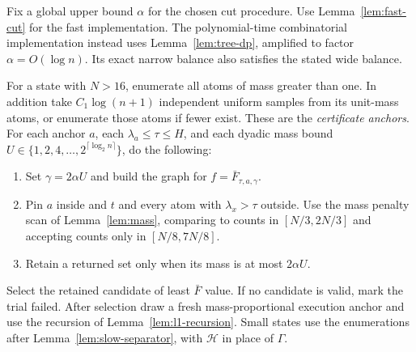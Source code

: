 \documentclass[11pt]{article}
\theoremstyle{definition}
\begin{document}
Fix a global upper bound $\alpha$ for the chosen cut procedure.
Use Lemma~\ref{lem:fast-cut} for the fast implementation.
The polynomial-time combinatorial implementation instead uses
Lemma~\ref{lem:tree-dp}, amplified to factor $\alpha=O(\log n)$.
Its exact narrow balance also satisfies the stated wide balance.

For a state with $N>16$, enumerate all atoms of mass greater than one.
In addition take $C_1\log(n+1)$ independent uniform samples from its
unit-mass atoms, or enumerate those atoms if fewer exist. These are the
\emph{certificate anchors}. For each anchor $a$, each
$\lambda_a\le\tau\le H$, and each dyadic mass bound
$U\in\{1,2,4,\ldots,2^{\lceil\log_2n\rceil}\}$, do the following:
\begin{enumerate}[label=(\arabic*)]
\item Set $\gamma=2\alpha U$ and build the graph for
$f=\bar F_{\tau,a,\gamma}$.
\item Pin $a$ inside and $t$ and every atom with $\lambda_x>\tau$ outside.
Use the mass penalty scan of Lemma~\ref{lem:mass}, comparing to counts
in $[N/3,2N/3]$ and accepting counts only in $[N/8,7N/8]$.
\item Retain a returned set only when its mass is at most $2\alpha U$.
\end{enumerate}
Select the retained candidate of least $\bar F$ value.
If no candidate is valid, mark the trial failed.
After selection draw a fresh mass-proportional execution anchor and
use the recursion of Lemma~\ref{lem:l1-recursion}.
Small states use the enumerations after Lemma~\ref{lem:slow-separator},
with $\mathcal H$ in place of $\Gamma$.
\end{document}
